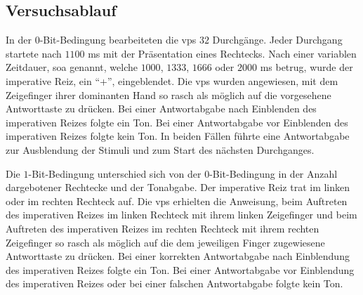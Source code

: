 \documentclass[11pt, twoside, a4paper]{book}		%
\begin{document}
%				
%				
%				
%			




\subsection{Versuchsablauf \label{subsec:hick_Versuchsablauf}}


In der $0$-Bit-Bedingung bearbeiteten die \glspl{vp} $32$ Durchgänge. Jeder Durchgang startete nach $1100$ ms mit der Präsentation eines Rechtecks. Nach einer variablen Zeitdauer, \gls{soa} genannt, welche $1000$, $1333$, $1666$ oder $2000$ ms betrug, wurde der imperative Reiz, ein \enquote{+}, eingeblendet. Die \glspl{vp} wurden angewiesen, mit dem Zeigefinger ihrer dominanten Hand so rasch als möglich auf die vorgesehene Antworttaste zu drücken. Bei einer Antwortabgabe nach Einblenden des imperativen Reizes folgte ein Ton. Bei einer Antwortabgabe vor Einblenden des imperativen Reizes folgte kein Ton. In beiden Fällen führte eine Antwortabgabe zur Ausblendung der Stimuli und zum Start des nächsten Durchganges.

Die $1$-Bit-Bedingung unterschied sich von der $0$-Bit-Bedingung in der Anzahl dargebotener Rechtecke und der Tonabgabe. Der imperative Reiz trat im linken oder im rechten Rechteck auf. Die \glspl{vp} erhielten die Anweisung, beim Auftreten des imperativen Reizes im linken Rechteck mit ihrem linken Zeigefinger und beim Auftreten des imperativen Reizes im rechten Rechteck mit ihrem rechten Zeigefinger so rasch als möglich auf die dem jeweiligen Finger zugewiesene Antworttaste zu drücken. Bei einer korrekten Antwortabgabe nach Einblendung des imperativen Reizes folgte ein Ton. Bei einer Antwortabgabe vor Einblendung des imperativen Reizes oder bei einer falschen Antwortabgabe folgte kein Ton.
\end{document}
